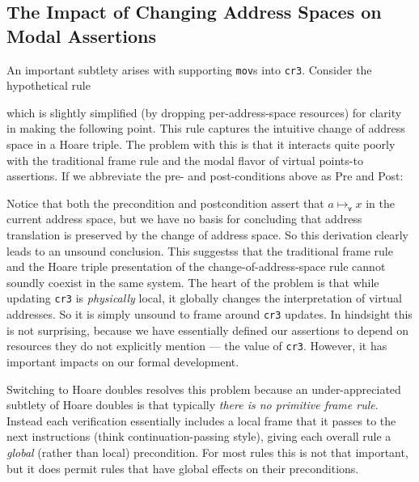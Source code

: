 \documentclass[acmsmall,screen,nonacm]{acmart}
\begin{document}
\subsection{The Impact of Changing Address Spaces on Modal Assertions}
%
%
\label{sec:issues}
An important subtlety arises with supporting \lstinline|mov|s into \lstinline|cr3|. Consider the hypothetical rule
\begin{mathpar}
\end{mathpar}
which is slightly simplified (by dropping per-address-space resources) for clarity in making the following point.
This rule captures the intuitive change of address space in a Hoare triple.
The problem with this is that it interacts quite poorly with the traditional frame
rule and the modal flavor of virtual points-to assertions.
If we abbreviate the pre- and post-conditions above as \textsf{Pre} and \textsf{Post}:
\begin{mathpar}
\end{mathpar}
Notice that both the precondition and postcondition assert that $a\mapsto_\mathsf{v} x$ in the current address space, but we have no basis for concluding that address translation is preserved by the change of address space. So this derivation clearly leads to an unsound conclusion. 
This suggestss that the traditional frame rule and the Hoare triple presentation of the change-of-address-space rule cannot soundly coexist in the same system.
The heart of the problem is that while updating \lstinline|cr3| is \emph{physically} local, it globally changes the interpretation of virtual addresses. So it is simply unsound to frame around \lstinline|cr3| updates.
In hindsight this is not surprising, because we have essentially defined
our assertions to depend on resources they do not explicitly mention --- the value of \lstinline|cr3|.
However, it has important impacts on our formal development.


Switching to Hoare doubles resolves this problem because an under-appreciated subtlety of Hoare doubles 
is that typically \emph{there is no primitive frame rule}. 
Instead each verification essentially includes a local frame that it passes to the next instructions
(think continuation-passing style), giving each overall rule a \emph{global} (rather than local) precondition. For most rules this is not that important, but it does permit rules that have global effects on their preconditions.
\end{document}
